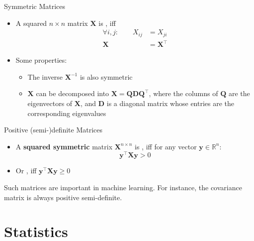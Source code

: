 \begin{frame}{Symmetric Matrices}{}
	\begin{itemize}
		\item A squared $n \times n$ matrix $\bm{X}$ is , iff
		\begin{align}
			\forall i, j: \qquad X_{ij}
				&= X_{ji} \\
			\bm{X}
				&= \bm{X}^{\intercal}
		\end{align}
		\item Some properties:
		\begin{itemize}
			\item The inverse $\bm{X}^{-1}$ is also symmetric
			\item {} $\bm{X}$ can be decomposed into $\bm{X} = \bm{Q} \bm{D} \bm{Q}^{\intercal}$,
				where the columns of $\bm{Q}$ are the eigenvectors of $\bm{X}$, and $\bm{D}$ is a diagonal matrix whose
				entries are the corresponding eigenvalues
		\end{itemize}
	\end{itemize}
\end{frame}


\begin{frame}{Positive (semi-)definite Matrices}{}
	\begin{itemize}
		\item A \textbf{squared symmetric} matrix $\bm{X}^{n \times n}$ is ,
			iff for any vector $\bm{y} \in \mathbb{R}^n$:
		\begin{equation}
			\bm{y}^{\intercal} \bm{X} \bm{y} > 0
		\end{equation}
		\item Or , iff $\bm{y}^{\intercal} \bm{X} \bm{y} \ge 0$
	\end{itemize}
	
	\vspace*{3mm}
	\begin{boxBlueNoFrame}
		Such matrices are important in machine learning. For instance, the covariance matrix is always positive semi-definite.
	\end{boxBlueNoFrame}
\end{frame}


\section{Statistics}


